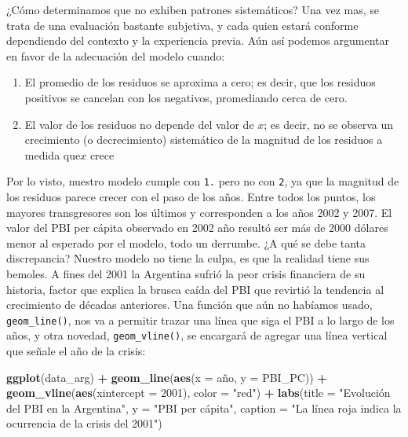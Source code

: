 \documentclass[]{book}
\newenvironment{Shaded}{\begin{snugshade}}{\end{snugshade}}
\newcommand{\KeywordTok}[1]{\textcolor[rgb]{0.13,0.29,0.53}{\textbf{#1}}}
\newcommand{\DataTypeTok}[1]{\textcolor[rgb]{0.13,0.29,0.53}{#1}}
\newcommand{\DecValTok}[1]{\textcolor[rgb]{0.00,0.00,0.81}{#1}}
\newcommand{\StringTok}[1]{\textcolor[rgb]{0.31,0.60,0.02}{#1}}
\newcommand{\OperatorTok}[1]{\textcolor[rgb]{0.81,0.36,0.00}{\textbf{#1}}}
\newcommand{\NormalTok}[1]{#1}
\providecommand{\tightlist}{%
  \setlength{\itemsep}{0pt}\setlength{\parskip}{0pt}}
\begin{document}
¿Cómo determinamos que no exhiben patrones sistemáticos? Una vez mas, se
trata de una evaluación bastante subjetiva, y cada quien estará conforme
dependiendo del contexto y la experiencia previa. Aún así podemos
argumentar en favor de la adecuación del modelo cuando:

\begin{enumerate}
\def\labelenumi{\arabic{enumi}.}
\tightlist
\item
  El promedio de los residuos se aproxima a cero; es decir, que los
  residuos positivos se cancelan con los negativos, promediando cerca de
  cero.
\item
  El valor de los residuos no depende del valor de \(x\); es decir, no
  se observa un crecimiento (o decrecimiento) sistemático de la magnitud
  de los residuos a medida que\(x\) crece
\end{enumerate}

Por lo visto, nuestro modelo cumple con \texttt{1.} pero no con
\texttt{2}, ya que la magnitud de los residuos parece crecer con el paso
de los años. Entre todos los puntos, los mayores transgresores son los
últimos y corresponden a los años 2002 y 2007. El valor del PBI per
cápita observado en 2002 año resultó ser más de 2000 dólares menor al
esperado por el modelo, todo un derrumbe. ¿A qué se debe tanta
discrepancia? Nuestro modelo no tiene la culpa, es que la realidad tiene
sus bemoles. A fines del 2001 la Argentina sufrió la peor crisis
financiera de su historia, factor que explica la brusca caída del PBI
que revirtió la tendencia al crecimiento de décadas anteriores. Una
función que aún no habíamos usado, \texttt{geom\_line()}, nos va a
permitir trazar una línea que siga el PBI a lo largo de los años, y otra
novedad, \texttt{geom\_vline()}, se encargará de agregar una línea
vertical que señale el año de la crisis:

\begin{Shaded}
\begin{Highlighting}[]
\KeywordTok{ggplot}\NormalTok{(data_arg) }\OperatorTok{+}\StringTok{ }
\StringTok{    }\KeywordTok{geom_line}\NormalTok{(}\KeywordTok{aes}\NormalTok{(}\DataTypeTok{x =}\NormalTok{ año, }\DataTypeTok{y =}\NormalTok{ PBI_PC)) }\OperatorTok{+}
\StringTok{    }\KeywordTok{geom_vline}\NormalTok{(}\KeywordTok{aes}\NormalTok{(}\DataTypeTok{xintercept =} \DecValTok{2001}\NormalTok{), }\DataTypeTok{color =} \StringTok{"red"}\NormalTok{) }\OperatorTok{+}
\StringTok{    }\KeywordTok{labs}\NormalTok{(}\DataTypeTok{title =} \StringTok{"Evolución del PBI en la Argentina"}\NormalTok{,}
         \DataTypeTok{y =} \StringTok{"PBI per cápita"}\NormalTok{,}
         \DataTypeTok{caption =} \StringTok{"La línea roja indica la ocurrencia de la crisis del 2001"}\NormalTok{)}
\end{Highlighting}
\end{Shaded}
\end{document}
